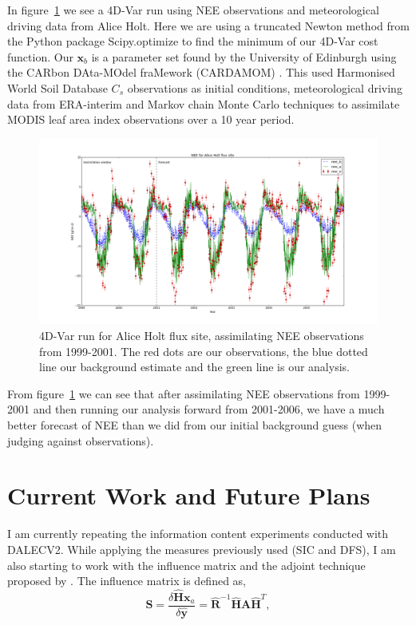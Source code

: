 \documentclass[11pt]{article}
\begin{document}
In figure~\ref{fig:4dvar} we see a 4D-Var run using NEE observations and meteorological driving data from Alice Holt. Here we are using a truncated Newton method \citep{Nocedal1999} from the Python package Scipy.optimize to find the minimum of our 4D-Var cost function. Our $\textbf{x}_b$ is a parameter set found by the University of Edinburgh using the CARbon DAta-MOdel fraMework (CARDAMOM) \citep{Exbrayat2015}. This used Harmonised World Soil Database $C_{s}$ observations as initial conditions, meteorological driving data from ERA-interim and Markov chain Monte Carlo techniques to assimilate MODIS leaf area index observations over a 10 year period. 

\begin{figure}[!hb]
    \centering
    \includegraphics[width=.9\textwidth]{ah_assim_edinpvals.png}
    \caption{4D-Var run for Alice Holt flux site, assimilating NEE observations from 1999-2001. The red dots are our observations, the blue dotted line our background estimate and the green line is our analysis.}
    \label{fig:4dvar}
\end{figure}

From figure~\ref{fig:4dvar} we can see that after assimilating NEE observations from 1999-2001 and then running our analysis forward from 2001-2006, we have a much better forecast of NEE than we did from our initial background guess (when judging against observations). 

\section{Current Work and Future Plans}

I am currently repeating the information content experiments conducted with DALECV2. While applying the measures previously used (SIC and DFS), I am also starting to work with the influence matrix \citep{Cardinali2004} and the adjoint technique proposed by \cite{Langland2004}. The influence matrix is defined as,
\begin{equation}
\textbf{S} = \frac{\delta \hat{\mathbf{H}}\textbf{x}_a}{\delta \hat{\textbf{y}}} = \hat{\textbf{R}}^{-1}\hat{\mathbf{H}}\textbf{A}\hat{\mathbf{H}}^{T},
\end{equation}
\end{document}
